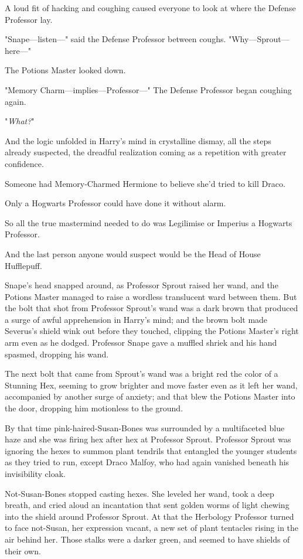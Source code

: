 A loud fit of hacking and coughing caused everyone to look at where the Defense 
Professor lay.

"Snape---listen---" said the Defense Professor between coughs. 
"Why---Sprout---here---"

The Potions Master looked down.

"Memory Charm---implies---Professor---" The Defense Professor began coughing 
again.

"\emph{What?}"

And the logic unfolded in Harry's mind in crystalline dismay, all the steps 
already suspected, the dreadful realization coming as a repetition with greater 
confidence.

Someone had Memory-Charmed Hermione to believe she'd tried to kill Draco.

Only a Hogwarts Professor could have done it without alarm.

So all the true mastermind needed to do was Legilimise or Imperius a Hogwarts 
Professor.

And the last person anyone would suspect would be the Head of House Hufflepuff.

Snape's head snapped around, as Professor Sprout raised her wand, and the 
Potions Master managed to raise a wordless translucent ward between them. But 
the bolt that shot from Professor Sprout's wand was a dark brown that produced 
a surge of awful apprehension in Harry's mind; and the brown bolt made 
Severus's shield wink out before they touched, clipping the Potions Master's 
right arm even as he dodged. Professor Snape gave a muffled shriek and his hand 
spasmed, dropping his wand.

The next bolt that came from Sprout's wand was a bright red the color of a 
Stunning Hex, seeming to grow brighter and move faster even as it left her 
wand, accompanied by another surge of anxiety; and that blew the Potions Master 
into the door, dropping him motionless to the ground.

By that time pink-haired-Susan-Bones was surrounded by a multifaceted blue haze 
and she was firing hex after hex at Professor Sprout. Professor Sprout was 
ignoring the hexes to summon plant tendrils that entangled the younger students 
as they tried to run, except Draco Malfoy, who had again vanished beneath his 
invisibility cloak.

Not-Susan-Bones stopped casting hexes. She leveled her wand, took a deep 
breath, and cried aloud an incantation that sent golden worms of light chewing 
into the shield around Professor Sprout. At that the Herbology Professor turned 
to face not-Susan, her expression vacant, a new set of plant tentacles rising 
in the air behind her. Those stalks were a darker green, and seemed to have 
shields of their own.

